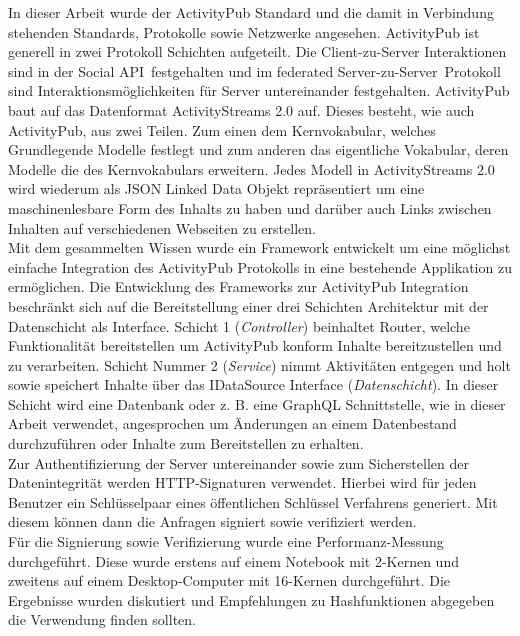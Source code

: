 

\Abstract
In dieser Arbeit wurde der ActivityPub Standard und die damit in Verbindung stehenden Standards, Protokolle sowie Netzwerke angesehen. ActivityPub ist generell in zwei Protokoll Schichten aufgeteilt. Die Client-zu-Server Interaktionen sind in der \glqq Social API\grqq~festgehalten und im \glqq federated Server-zu-Server\grqq~Protokoll sind Interaktionsmöglichkeiten für Server untereinander festgehalten. ActivityPub baut auf das Datenformat ActivityStreams 2.0 auf. Dieses besteht, wie auch ActivityPub, aus zwei Teilen. Zum einen dem Kernvokabular, welches Grundlegende Modelle festlegt und zum anderen das eigentliche Vokabular, deren Modelle die des Kernvokabulars erweitern. Jedes Modell in ActivityStreams 2.0 wird wiederum als JSON Linked Data Objekt repräsentiert um eine maschinenlesbare Form des Inhalts zu haben und darüber auch Links zwischen Inhalten auf verschiedenen Webseiten zu erstellen.\\

Mit dem gesammelten Wissen wurde ein Framework entwickelt um eine möglichst einfache Integration des ActivityPub Protokolls in eine bestehende Applikation zu ermöglichen. Die Entwicklung des Frameworks zur ActivityPub Integration beschränkt sich auf die Bereitstellung einer drei Schichten Architektur mit der Datenschicht als Interface. Schicht 1 (\textit{Controller}) beinhaltet Router, welche Funktionalität bereitstellen um ActivityPub konform Inhalte bereitzustellen und zu verarbeiten. Schicht Nummer 2 (\textit{Service}) nimmt Aktivitäten entgegen und holt sowie speichert Inhalte über das IDataSource Interface (\textit{Datenschicht}). In dieser Schicht wird eine Datenbank oder z. B. eine GraphQL Schnittstelle, wie in dieser Arbeit verwendet, angesprochen um Änderungen an einem Datenbestand durchzuführen oder Inhalte zum Bereitstellen zu erhalten.\\

Zur Authentifizierung der Server untereinander sowie zum Sicherstellen der Datenintegrität werden HTTP-Signaturen verwendet. Hierbei wird für jeden Benutzer ein Schlüsselpaar eines öffentlichen Schlüssel Verfahrens generiert. Mit diesem können dann die Anfragen signiert sowie verifiziert werden.\\

Für die Signierung sowie Verifizierung wurde eine Performanz-Messung durchgeführt. Diese wurde erstens auf einem Notebook mit 2-Kernen und zweitens auf einem Desktop-Computer mit 16-Kernen durchgeführt. Die Ergebnisse wurden diskutiert und Empfehlungen zu Hashfunktionen abgegeben die Verwendung finden sollten.